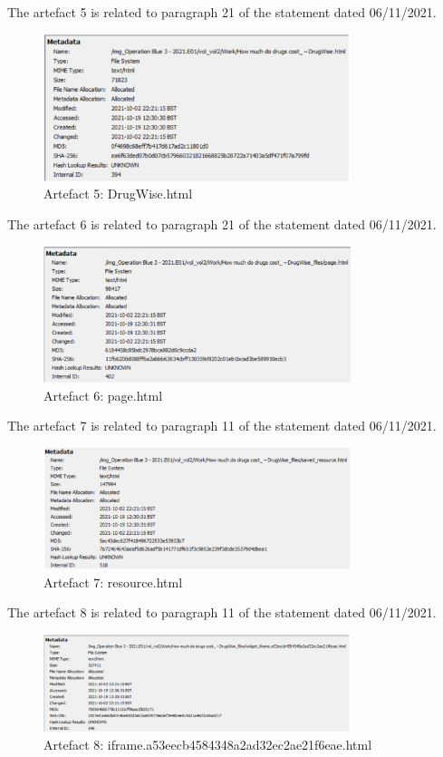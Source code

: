 \newpage
The artefact 5 is related to paragraph 21 of the statement dated 06/11/2021.
\begin{figure}[H]
  \centering
  \includegraphics[width=0.8\textwidth]{figures/meta5}
  \caption{Artefact 5: DrugWise.html}
  \label{f:meta5}
\end{figure}
The artefact 6 is related to paragraph 21 of the statement dated 06/11/2021.
\begin{figure}[H]
  \centering
  \includegraphics[width=0.8\textwidth]{figures/meta6}
  \caption{Artefact 6: page.html}
  \label{f:meta6}
\end{figure}
\newpage
The artefact 7 is related to paragraph 11 of the statement dated 06/11/2021.
\begin{figure}[H]
  \centering
  \includegraphics[width=0.8\textwidth]{figures/meta7}
  \caption{Artefact 7: resource.html}
  \label{f:meta7}
\end{figure}
The artefact 8 is related to paragraph 11 of the statement dated 06/11/2021.
\begin{figure}[H]
  \centering
  \includegraphics[width=0.8\textwidth]{figures/meta8}
  \caption{Artefact 8: iframe.a53eecb4584348a2ad32ec2ae21f6eae.html}
  \label{f:meta8}
\end{figure}
